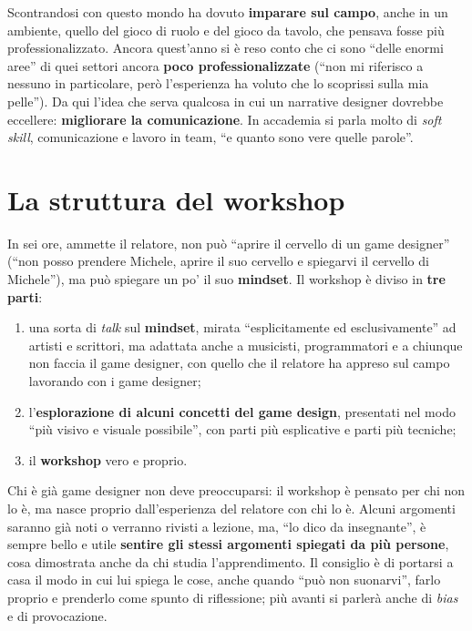 Scontrandosi con questo mondo ha dovuto \textbf{imparare sul campo}, anche in un
ambiente, quello del gioco di ruolo e del gioco da tavolo, che pensava fosse
più professionalizzato. Ancora quest'anno si è reso conto che ci sono
``delle enormi aree'' di quei settori ancora \textbf{poco professionalizzate}
(``non mi riferisco a nessuno in particolare, però l'esperienza ha voluto che
lo scoprissi sulla mia pelle''). Da qui l'idea che serva qualcosa in cui un
narrative designer dovrebbe eccellere: \textbf{migliorare la comunicazione}. In
accademia si parla molto di \emph{soft skill}, comunicazione e lavoro in team,
``e quanto sono vere quelle parole''.

\section{La struttura del workshop}
\label{sec:z6-struttura}

In sei ore, ammette il relatore, non può ``aprire il cervello di un game
designer'' (``non posso prendere Michele, aprire il suo cervello e spiegarvi il
cervello di Michele''), ma può spiegare un po' il suo \textbf{mindset}. Il
workshop è diviso in \textbf{tre parti}:
\begin{enumerate}
  \item una sorta di \emph{talk} sul \textbf{mindset}, mirata ``esplicitamente
        ed esclusivamente'' ad artisti e scrittori, ma adattata anche a
        musicisti, programmatori e a chiunque non faccia il game designer, con
        quello che il relatore ha appreso sul campo lavorando con i game
        designer;
  \item l'\textbf{esplorazione di alcuni concetti del game design}, presentati
        nel modo ``più visivo e visuale possibile'', con parti più esplicative e
        parti più tecniche;
  \item il \textbf{workshop} vero e proprio.
\end{enumerate}
Chi è già game designer non deve preoccuparsi: il workshop è pensato per chi
non lo è, ma nasce proprio dall'esperienza del relatore con chi lo è. Alcuni
argomenti saranno già noti o verranno rivisti a lezione, ma, ``lo dico da
insegnante'', è sempre bello e utile \textbf{sentire gli stessi argomenti
spiegati da più persone}, cosa dimostrata anche da chi studia l'apprendimento.
Il consiglio è di portarsi a casa il modo in cui lui spiega le cose, anche
quando ``può non suonarvi'', farlo proprio e prenderlo come spunto di
riflessione; più avanti si parlerà anche di \emph{bias} e di provocazione.

